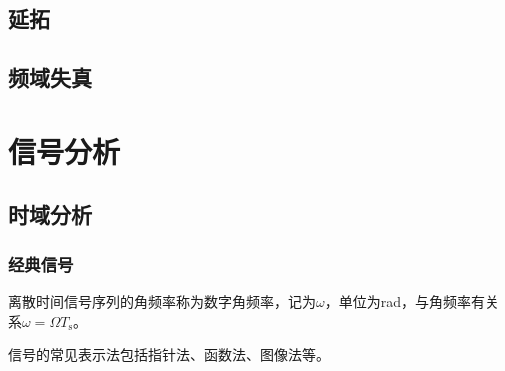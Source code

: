 \documentclass[UTF8,fontset=fandol,zihao=5]{ctexart}
\begin{document}
\subsection{延拓}

\subsection{频域失真}

\section{信号分析}

\subsection{时域分析}

\subsubsection{经典信号}

离散时间信号序列的角频率称为数字角频率，记为$\omega$，单位为rad，与角频率有关系$\omega=\varOmega T_{\mathrm{s}}$。

信号的常见表示法包括指针法、函数法、图像法等。
\end{document}

